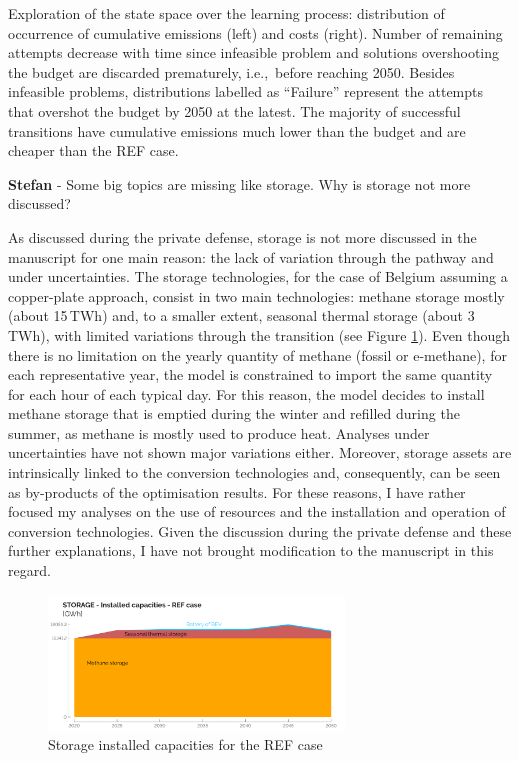 \documentclass[12pt,a4paper]{article}
\def\ie{i.e.,\ }
\begin{document}
\begin{mdframed}[style=manuscript] %
Exploration of the state space over the learning process: distribution of occurrence of cumulative emissions (left) and costs (right). Number of remaining attempts decrease with time since infeasible problem and solutions overshooting the  budget are discarded prematurely, \ie before reaching 2050. Besides infeasible problems, distributions labelled as ``Failure'' represent the attempts that overshot the  budget by 2050 at the latest. The majority of successful transitions have cumulative emissions much lower than the  budget and are cheaper than the REF case. 
\end{mdframed}

\begin{mdframed}[style=comment] %
{\color{teal} \textbf{Stefan}} - Some big topics are missing like storage. Why is storage not more discussed? 
\end{mdframed}

\noindent As discussed during the private defense, storage is not more discussed in the manuscript for one main reason: the lack of variation through the pathway and under uncertainties. The storage technologies, for the case of Belgium assuming a copper-plate approach, consist in two main technologies: methane storage mostly (about 15\,TWh) and, to a smaller extent, seasonal thermal storage (about 3\,TWh), with limited variations through the transition (see Figure \ref{fig:STORAGE_2}). Even though there is no limitation on the yearly quantity of methane (fossil or e-methane), for each representative year, the model is constrained to import the same quantity for each hour of each typical day. For this reason, the model decides to install methane storage that is emptied during the winter and refilled during the summer, as methane is mostly used to produce heat. Analyses under uncertainties have not shown major variations either. Moreover, storage assets are intrinsically linked to the conversion technologies and, consequently, can be seen as by-products of the optimisation results. For these reasons, I have rather focused my analyses on the use of resources and the installation and operation of conversion technologies. Given the discussion during the private defense and these further explanations, I have not brought modification to the manuscript in this regard.

\begin{figure}[htbp!]
\centering
\includegraphics[width=0.7\textwidth]{STORAGE_2.pdf}
\caption{Storage installed capacities for the REF case}
\label{fig:STORAGE_2}
\end{figure}
\end{document}
